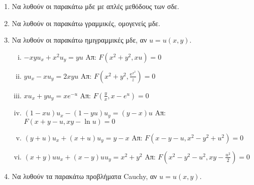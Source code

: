 



\thispagestyle{askhseis}



\begin{center}
  \minibox{\large\bfseries \textcolor{Col1}{ΜΔΕ 1ης τάξης}}
\end{center}

\vspace{\baselineskip}

\begin{enumerate}
  \item Να λυθούν οι παρακάτω μδε με απλές μεθόδους των σδε.
    

  \item Να λυθούν οι παρακάτω γραμμικές, ομογενείς μδε.

    

  \item Να λυθούν οι παρακάτω ημιγραμμικές μδε, αν $u=u(x,y)$.

    \begin{enumerate}[i)]
      \item $-xyu_{x}+x^{2}u_{y}=yu$ \hfill Απ: $F(x^{2}+y^{2},xu)=0$
      \item $ yu_{x}-xu_{y}=2xyu $ 
        \hfill Απ: $ F(x^{2}+y^{2}, \frac{\mathrm{e}^{x^{2}}}{z})=0 $  

      \item $xu_{x}+yu_{y}=xe^{-u}$ \hfill Απ: $F(\frac{y}{x},x-e^{u})=0$
      \item $(1-xu)u_{x}-(1-yu)u_{y}=(y-x)u$ \hfill Απ: $F(x+y-u,xy-\ln u)=0$
      \item $(y+u)u_{x}+(x+u)u_{y}=y-x$ \hfill Απ: $F(x-y-u,x^{2}-y^{2}+u^{2})=0$
      \item $(x+y)uu_{x}+(x-y)uu_{y}=x^{2}+y^{2}$ 
        \hfill Απ: $F(x^{2}-y^{2}-u^{2},xy-\frac{u^{2}}{2})=0$
    \end{enumerate}
  \item Να λυθούν τα παρακάτω προβλήματα Cauchy, αν $u=u(x,y)$.


\end{enumerate}

